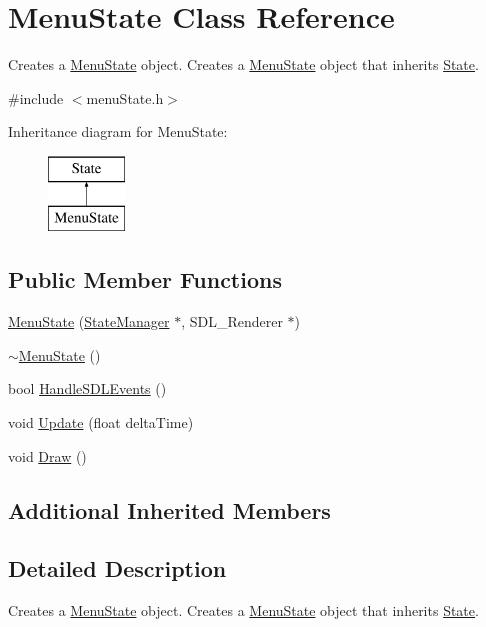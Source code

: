 \hypertarget{class_menu_state}{\section{Menu\+State Class Reference}
\label{class_menu_state}
}


Creates a \hyperlink{class_menu_state}{Menu\+State} object. Creates a \hyperlink{class_menu_state}{Menu\+State} object that inherits \hyperlink{class_state}{State}.  




{\ttfamily \#include $<$menu\+State.\+h$>$}

Inheritance diagram for Menu\+State\+:\begin{figure}[H]
\begin{center}
\leavevmode
\includegraphics[height=2.000000cm]{class_menu_state}
\end{center}
\end{figure}
\subsection*{Public Member Functions}
\begin{DoxyCompactItemize}
\item 
\hyperlink{class_menu_state_a0cfcaba0ed63cdbcaf2d517e6bfbd2a2}{Menu\+State} (\hyperlink{class_state_manager}{State\+Manager} $\ast$, S\+D\+L\+\_\+\+Renderer $\ast$)
\item 
\hyperlink{class_menu_state_a58aea91a44436c5bba575c5de755a5bc}{$\sim$\+Menu\+State} ()
\item 
bool \hyperlink{class_menu_state_abab3b8017d47c6d6134cbdfb8e0c7580}{Handle\+S\+D\+L\+Events} ()
\item 
void \hyperlink{class_menu_state_a2ee9793bd50c42d8c7ce4cab62fbeba6}{Update} (float delta\+Time)
\item 
void \hyperlink{class_menu_state_a0fc92c6a39ef316552f1308c188871c6}{Draw} ()
\end{DoxyCompactItemize}
\subsection*{Additional Inherited Members}


\subsection{Detailed Description}
Creates a \hyperlink{class_menu_state}{Menu\+State} object. Creates a \hyperlink{class_menu_state}{Menu\+State} object that inherits \hyperlink{class_state}{State}. 

